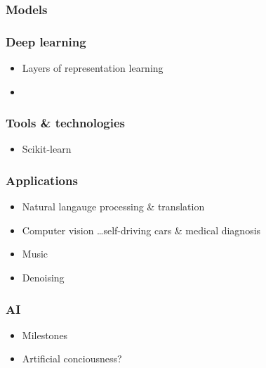 \documentclass[xcolor={dvipsnames}]{beamer}
\newtheorem{nofreelunch}{No Free Lunch Theorem}
\begin{document}
\begin{frame}
  \frametitle{Models}
\end{frame}

\begin{frame}
  \frametitle{Deep learning}
  \begin{itemize}
    \item<+-> Layers of representation learning
    \item<+->
  \end{itemize}
\end{frame}

\begin{frame}
  \frametitle{Tools \& technologies}
  \begin{itemize}
    \item Scikit-learn
  \end{itemize}
\end{frame}

\begin{frame}
  \frametitle{Applications}
  \begin{itemize}
    \item<+-> Natural langauge processing \& translation
    \item<+-> Computer vision \ldots self-driving cars \& medical diagnosis
    \item<+-> Music
    \item<+-> Denoising
  \end{itemize}
\end{frame}

\begin{frame}
  \frametitle{AI}
  \begin{itemize}
    \item Milestones
    \item Artificial conciousness?
  \end{itemize}
\end{frame}
\end{document}
